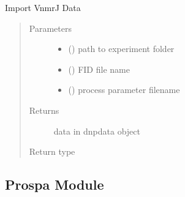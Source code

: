 \documentclass[letterpaper,10pt,english]{sphinxmanual}
\begin{document}
\begin{fulllineitems}
\label{\detokenize{dnpImport:dnpLab.dnpImport.vnmrj.import_vnmrj}}
Import VnmrJ Data
\begin{quote}\begin{description}
\item[{Parameters}] \leavevmode\begin{itemize}
\item {} 
 () \sphinxhyphen{}\sphinxhyphen{} path to experiment folder

\item {} 
 () \sphinxhyphen{}\sphinxhyphen{} FID file name

\item {} 
 () \sphinxhyphen{}\sphinxhyphen{} process parameter filename

\end{itemize}

\item[{Returns}] \leavevmode
data in dnpdata object

\item[{Return type}] \leavevmode
{\hyperref[\detokenize{dnpData:dnpLab.dnpdata}]{}}

\end{description}\end{quote}

\end{fulllineitems}



\subsection{Prospa Module}
\label{\detokenize{dnpImport:module-dnpLab.dnpImport.prospa}}\label{\detokenize{dnpImport:prospa-module}}\label{\detokenize{dnpImport:prospa}}
\end{document}
